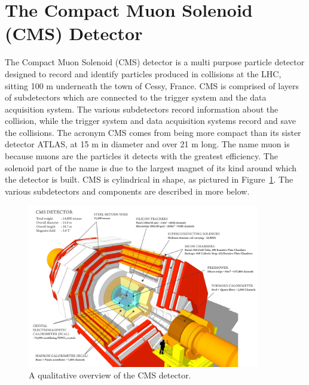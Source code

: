 \section{The Compact Muon Solenoid (CMS) Detector}
The Compact Muon Solenoid (CMS) detector is a multi purpose particle detector designed to record and identify particles produced in collisions at the LHC, sitting 100 m underneath
the town of Cessy, France. CMS is comprised of layers of subdetectors which are connected to the trigger system and the data acquisition system.
The various subdetectors record information about the collision, while the trigger system and
data acquisition systems record and save the collisions. The acronym CMS comes from being more compact than its sister detector ATLAS, at 15 m in diameter and
over 21 m long. The name muon is because muons are the particles it detects with the greatest efficiency. The solenoid part of the name is due to the largest magnet of its kind
around which the detector is built. CMS is cylindrical in shape, as pictured in Figure~\ref{fig:cms_overview}. The various subdetectors and components are described in more
below. 

\begin{figure}[hbtp]
 \begin{center}
   \includegraphics[width=0.9\textwidth]{cms_overview.pdf}
   \caption[text in square brackets]{A qualitative overview of the CMS detector.}
   \label{fig:cms_overview}
 \end{center}
\end{figure}


